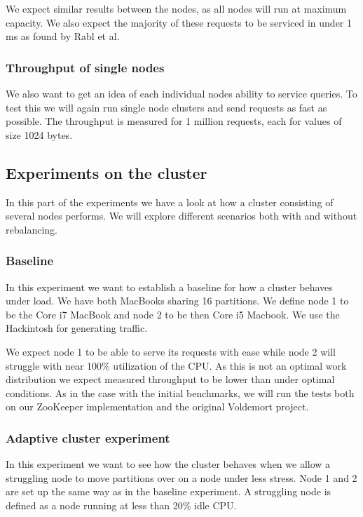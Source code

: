 We expect similar results between the nodes, as all nodes will run at maximum capacity. We also expect the majority of these requests to be serviced in under 1 ms as found by Rabl et al\cite{Rabl:2012:SBD:2367502.2367512}.

\subsubsection{Throughput of single nodes}
We also want to get an idea of each individual nodes ability to service queries. To test this we will again run single node clusters and send requests as fast as possible. The throughput is measured for 1 million requests, each for values of size 1024 bytes.


\subsection{Experiments on the cluster}
In this part of the experiments we have a look at how a cluster consisting of several nodes performs. We will explore different scenarios both with and without rebalancing.

\subsubsection{Baseline}
In this experiment we want to establish a baseline for how a cluster behaves under load. We have both MacBooks sharing 16 partitions. We define node 1 to be the Core i7 MacBook and node 2 to be then Core i5 Macbook.  We use the Hackintosh for generating traffic. 

We expect node 1 to be able to serve its requests with ease while node 2 will struggle with near 100\% utilization of the CPU. As this is not an optimal work distribution we expect measured throughput to be lower than under optimal conditions. As in the case with the initial benchmarks, we will run the tests both on our ZooKeeper implementation and the original Voldemort project. 

\subsubsection{Adaptive cluster experiment}
In this experiment we want to see how the cluster behaves when we allow a struggling node to move partitions over on a node under less stress. Node 1 and 2 are set up the same way as in the baseline experiment. A struggling node is defined as a node running at less than 20\% idle CPU.

